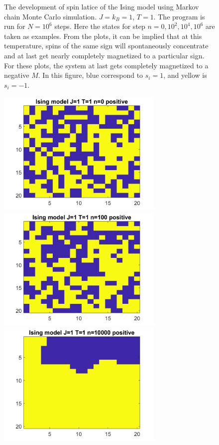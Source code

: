 \documentclass[12pt, graphicx]{article}
\begin{document}
\begin{figure}[ht]
\begin{minipage}{0.48\linewidth}
\end{minipage}
\caption{The development of spin latice of the Ising model using Markov chain Monte Carlo simulation. $J=k_B=1$, $T=1$. The program is run for $N=10^6$ steps. Here the states for step $n=0,10^2,10^4,10^6$ are taken as examples. From the plots, it can be implied that at this temperature, spins of the same sign will spontaneously concentrate and at last get nearly completely magnetized to a particular sign. For these plots, the system at last gets completely magnetized to a negative $M$. In this figure, blue correspond to $s_i=1$, and yellow is $s_i=-1$.}
\label{fig:st1n}
\end{figure}

\begin{figure}[ht]
\centering
\begin{minipage}{0.48\linewidth}
\centering
\includegraphics[width = 80mm]{st1n0p.png}
\end{minipage}
\begin{minipage}{0.48\linewidth}
\centering
\includegraphics[width = 80mm]{st1n2p.png}
\end{minipage}
\begin{minipage}{0.48\linewidth}
\centering
\includegraphics[width = 80mm]{st1n4p.png}

\end{minipage}
\end{figure}
\end{document}
